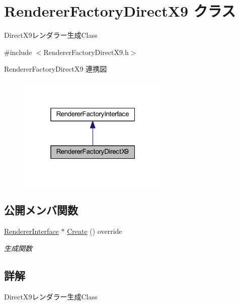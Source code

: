 \hypertarget{class_renderer_factory_direct_x9}{}\section{Renderer\+Factory\+Direct\+X9 クラス}
\label{class_renderer_factory_direct_x9}


Direct\+X9レンダラー生成\+Class  




{\ttfamily \#include $<$Renderer\+Factory\+Direct\+X9.\+h$>$}



Renderer\+Factory\+Direct\+X9 連携図\nopagebreak
\begin{figure}[H]
\begin{center}
\leavevmode
\includegraphics[width=205pt]{class_renderer_factory_direct_x9__coll__graph}
\end{center}
\end{figure}
\subsection*{公開メンバ関数}
\begin{DoxyCompactItemize}
\item 
\mbox{\hyperlink{class_renderer_interface}{Renderer\+Interface}} $\ast$ \mbox{\hyperlink{class_renderer_factory_direct_x9_a55541ea707af7ba3c006b0ea11a1fd49}{Create}} () override
\begin{DoxyCompactList}\small\item\em 生成関数 \end{DoxyCompactList}\end{DoxyCompactItemize}


\subsection{詳解}
Direct\+X9レンダラー生成\+Class 


